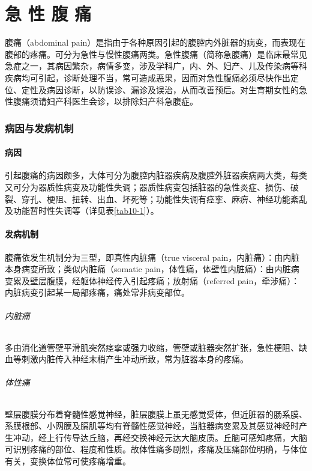 \protect\hypertarget{text00026.html}{}{}

\chapter{急 性 腹 痛}

腹痛（abdominal
pain）是指由于各种原因引起的腹腔内外脏器的病变，而表现在腹部的疼痛。可分为急性与慢性腹痛两类。急性腹痛（简称急腹痛）是临床最常见急症之一，其病因繁杂，病情多变，涉及学科广，内、外、妇产、儿及传染病等科疾病均可引起，诊断处理不当，常可造成恶果，因而对急性腹痛必须尽快作出定位、定性及病因诊断，以防误诊、漏诊及误治，从而改善预后。对生育期女性的急性腹痛须请妇产科医生会诊，以排除妇产科急腹症。

\subsection{病因与发病机制}

\subsubsection{病因}

引起腹痛的病因颇多，大体可分为腹腔内脏器疾病及腹腔外脏器疾病两大类，每类又可分为器质性病变及功能性失调；器质性病变包括脏器的急性炎症、损伤、破裂、穿孔、梗阻、扭转、出血、坏死等；功能性失调有痉挛、麻痹、神经功能紊乱及功能暂时性失调等（详见表\ref{tab10-1}）。

\subsubsection{发病机制}

腹痛依发生机制分为三型，即真性内脏痛（true visceral
pain，内脏痛）：由内脏本身病变所致；类似内脏痛（somatic
pain，体性痛，体壁性内脏痛）：由内脏病变累及壁层腹膜，经躯体神经传入引起疼痛；放射痛（referred
pain，牵涉痛）：内脏病变引起某一局部疼痛，痛处常非病变部位。

\subparagraph{内脏痛}

多由消化道管壁平滑肌突然痉挛或强力收缩，管壁或脏器突然扩张，急性梗阻、缺血等刺激内脏传入神经末梢产生冲动所致，常为脏器本身的疼痛。

\subparagraph{体性痛}

壁层腹膜分布着脊髓性感觉神经，脏层腹膜上虽无感觉受体，但近脏器的肠系膜、系膜根部、小网膜及膈肌等均有脊髓性感觉神经，当脏器病变累及其感觉神经时产生冲动，经上行传导达丘脑，再经交换神经元达大脑皮质。丘脑可感知疼痛，大脑可识别疼痛的部位、程度和性质。故体性痛多剧烈，疼痛及压痛部位明确，与体位有关，变换体位常可使疼痛增重。

